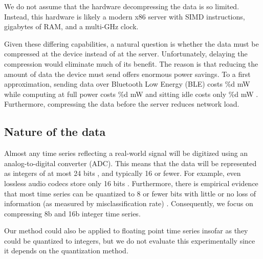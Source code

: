 We do not assume that the hardware decompressing the data is so limited. Instead, this hardware is likely a modern x86 server with SIMD instructions, gigabytes of RAM, and a multi-GHz clock.

Given these differing capabilities, a natural question is whether the data must be compressed at the device instead of at the server. Unfortunately, delaying the compression would eliminate much of its benefit. The reason is that reducing the amount of data the device must send offers enormous power savings. To a first approximation, sending data over Bluetooth Low Energy (BLE) costs \%d mW while computing at full power costs \%d mW and sitting idle costs only \%d mW \cite{TODO}. Furthermore, compressing the data before the server reduces network load.


\subsection{Nature of the data}

Almost any time series reflecting a real-world signal will be digitized using an analog-to-digital converter (ADC). This means that the data will be represented as integers of at most 24 bits \cite{digikeySearch}, and typically 16 or fewer. For example, even lossless audio codecs store only 16 bits \cite{someAudioCodecs, TODO}. Furthermore, there is empirical evidence that most time series can be quantized to 8 or fewer bits with little or no loss of information (as measured by misclassification rate) \cite{ucrWhateverItWas}. Consequently, we focus on compressing 8b and 16b integer time series. %

Our method could also be applied to floating point time series insofar as they could be quantized to integers, but we do not evaluate this experimentally since it depends on the quantization method.

